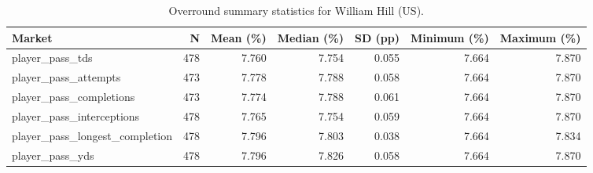 \begin{table}
\caption{Overround summary statistics for William Hill (US).}
\label{tab:overround_william_hill_us}
\begin{tabular}{lrrrrrr}
\toprule
Market & N & Mean (\%) & Median (\%) & SD (pp) & Minimum (\%) & Maximum (\%) \\
\midrule
player\_pass\_tds & 478 & 7.760 & 7.754 & 0.055 & 7.664 & 7.870 \\
player\_pass\_attempts & 473 & 7.778 & 7.788 & 0.058 & 7.664 & 7.870 \\
player\_pass\_completions & 473 & 7.774 & 7.788 & 0.061 & 7.664 & 7.870 \\
player\_pass\_interceptions & 478 & 7.765 & 7.754 & 0.059 & 7.664 & 7.870 \\
player\_pass\_longest\_completion & 478 & 7.796 & 7.803 & 0.038 & 7.664 & 7.834 \\
player\_pass\_yds & 478 & 7.796 & 7.826 & 0.058 & 7.664 & 7.870 \\
\bottomrule
\end{tabular}
\end{table}
